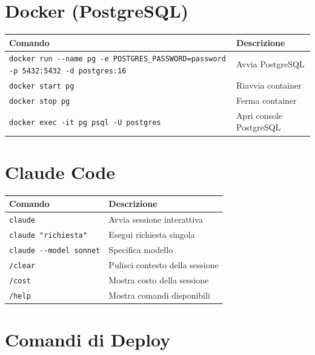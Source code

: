 \section{Docker (PostgreSQL)}

\begin{center}
\begin{small}
\begin{tabularx}{\textwidth}{l X}
\toprule
\textbf{Comando} & \textbf{Descrizione} \\
\midrule
\texttt{docker run -{}-name pg -e POSTGRES\_PASSWORD=password -p 5432:5432 -d postgres:16} & Avvia PostgreSQL \\
\texttt{docker start pg} & Riavvia container \\
\texttt{docker stop pg} & Ferma container \\
\texttt{docker exec -it pg psql -U postgres} & Apri console PostgreSQL \\
\bottomrule
\end{tabularx}
\end{small}
\end{center}

\section{Claude Code}

\begin{center}
\begin{tabularx}{\textwidth}{l X}
\toprule
\textbf{Comando} & \textbf{Descrizione} \\
\midrule
\texttt{claude} & Avvia sessione interattiva \\
\texttt{claude "richiesta"} & Esegui richiesta singola \\
\texttt{claude -{}-model sonnet} & Specifica modello \\
\texttt{/clear} & Pulisci contesto della sessione \\
\texttt{/cost} & Mostra costo della sessione \\
\texttt{/help} & Mostra comandi disponibili \\
\bottomrule
\end{tabularx}
\end{center}

\section{Comandi di Deploy}

